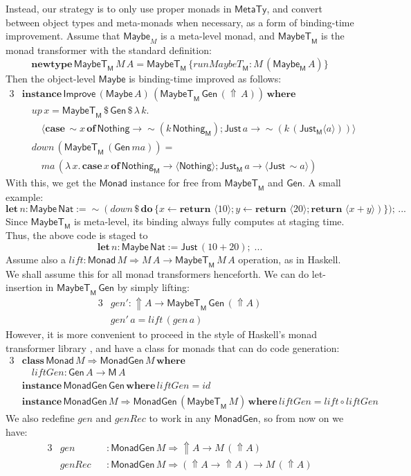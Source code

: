 \documentclass[acmsmall,screen,review,anonymous]{acmart}
\newcommand{\mit}[1]{\mathit{#1}}
\newcommand{\msf}[1]{\mathsf{#1}}
\newcommand{\mbf}[1]{\mathbf{#1}}
\newcommand{\bs}[1]{\boldsymbol{#1}}
\newcommand{\mdo}{\mbf{do}\,}
\newcommand{\ind}{\hspace{1em}}
\newcommand{\return}{\mbf{return}\,}
\newcommand{\lam}{\lambda\,}
\newcommand{\where}{\mbf{where}}
\newcommand{\M}{\msf{M}}
\newcommand{\of}{\mbf{of}\,}
\newcommand{\letdef}{\mbf{let\,}}
\newcommand{\vma}{\mit{ma}}
\newcommand{\Monad}{\msf{Monad}}
\newcommand{\fro}{\leftarrow}
\newcommand{\case}{\mbf{case\,}}
\newcommand{\Up}{{\Uparrow}}
\newcommand{\spl}{{\bs{\sim}}}
\newcommand{\ql}{{\bs{\langle}}}
\newcommand{\qr}{{\bs{\rangle}}}
\newcommand{\MTy}{\msf{MetaTy}}
\newcommand{\Nat}{\msf{Nat}}
\newcommand{\Maybe}{\msf{Maybe}}
\newcommand{\MaybeT}{\msf{MaybeT}}
\newcommand{\Nothing}{\msf{Nothing}}
\newcommand{\Just}{\msf{Just}}
\theoremstyle{remark}
\newcommand{\id}{\mit{id}}
\newcommand{\mup}{\mit{up}}
\newcommand{\mdown}{\mit{down}}
\newcommand{\tyclass}{\mbf{class}}
\newcommand{\instance}{\mbf{instance}\,}
\newcommand{\Improve}{\msf{Improve}}
\newcommand{\Gen}{\msf{Gen}}
\newcommand{\gen}{\mit{gen}}
\newcommand{\genRec}{\mit{genRec}}
\newcommand{\qt}[1]{\ql#1\qr}
\newcommand{\lift}{\mit{lift}}
\newcommand{\liftGen}{\mit{liftGen}}
\newcommand{\MonadGen}{\msf{MonadGen}}
\newcommand{\RA}{\Rightarrow}
\newcommand{\newtype}{\mbf{newtype}\,}
\newcommand{\runMaybeT}{\mit{runMaybeT}}
\newcommand{\dlr}{\,\$\,}
\begin{document}
Instead, our strategy is to only use proper monads in $\MTy$, and convert
between object types and meta-monads when necessary, as a form of binding-time
improvement. Assume that $\Maybe_M$ is a meta-level monad, and $\MaybeT_\M$ is
the monad transformer with the standard definition:
\[ \newtype \MaybeT_\M\,M\,A = \MaybeT_\M\,\{\runMaybeT_\M : M\,(\Maybe_\M\,A)\} \]
Then the object-level $\Maybe$ is binding-time improved as follows:
\begin{alignat*}{3}
  &\instance \Improve\,(\Maybe\,A)\,(\MaybeT_\M\,\Gen\,(\Up\,A))\,\where\\
  &\ind \mup\,x = \MaybeT_\M \dlr \Gen \dlr \lam k.\\
  &\ind\ind \qt{\case \spl x\,\of \Nothing \to \spl(k\,\Nothing_\M);\Just\,a \to \spl(k\,(\Just_\M\qt{a}))}\\
  &\ind \mdown\,(\MaybeT_\M\,(\Gen\,\vma)) = \\
  &\ind\ind \vma\,(\lam x.\,\case x\,\of \Nothing_\M \to \qt{\Nothing}; \Just_\M\,a \to \qt{\Just\,\spl a})
\end{alignat*}
With this, we get the $\Monad$ instance for free from $\MaybeT_\M$ and $\Gen$. A small example:
\[ \letdef n : \Maybe\,\Nat := \spl(\mdown\,\$\,\mdo \{x \fro \return\,\qt{10}; y \fro \return\,\qt{20}; \return\,\qt{x + y})\});\,... \]
Since $\MaybeT_\M$ is meta-level, its binding always fully computes at staging time. Thus, the above code is staged to
\[ \letdef n : \Maybe\,\Nat := \Just\,(10 + 20);\;... \]
Assume also a $\lift : \Monad\,M \RA M\,A \to \MaybeT_\M\,M\,A$ operation, as in
Haskell. We shall assume this for all monad transformers henceforth. We can do
let-insertion in $\MaybeT_\M\,\Gen$ by simply lifting:
\begin{alignat*}{3}
  &\gen' : \Up A \to \MaybeT_\M\,\Gen\,(\Up A) \\
  &\gen'\,a = \lift\,(\gen\,a)
\end{alignat*}
However, it is more convenient to proceed in the style of Haskell's monad
transformer library \cite{TODO}, and have a class for monads that can do code
generation:
\begin{alignat*}{3}
&\tyclass\,\Monad\,M \RA \MonadGen\,M\,\where\\
&\ind \liftGen : \Gen\,A \to \M\,A\\
&\instance \MonadGen\,\Gen\,\where\,\liftGen = \id \\
&\instance \MonadGen\,M \RA \MonadGen\,(\MaybeT_\M\,M)\,\where\,\liftGen = \lift \circ \liftGen
\end{alignat*}
We also redefine $\gen$ and $\genRec$ to work in any $\MonadGen$, so from now on we have:
\begin{alignat*}{3}
 & \gen   &&: \MonadGen\,M \RA \Up A \to M\,(\Up A)\\
 &\genRec &&: \MonadGen\,M \RA (\Up A \to \Up A) \to M\,(\Up A)
\end{alignat*}
\end{document}
